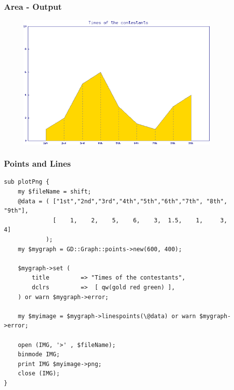 \documentclass{beamer}
\begin{document}
\begin{frame} \frametitle{Area - Output}
\begin{figure}[htbp]
\begin{center}
\includegraphics[width=0.9\textwidth]{image/3.png}
\end{center}
\end{figure}
\end{frame}

\begin{frame}[fragile] \frametitle{Points and Lines}
\begin{lstlisting}[language=perl_u,breaklines=true]
sub plotPng {    
    my $fileName = shift;
    @data = ( ["1st","2nd","3rd","4th","5th","6th","7th", "8th", "9th"],
              [    1,    2,    5,    6,    3,  1.5,    1,     3,     4]
            );
    my $mygraph = GD::Graph::points->new(600, 400);
    
    $mygraph->set (
        title         => "Times of the contestants",
        dclrs         =>  [ qw(gold red green) ],
    ) or warn $mygraph->error;

    my $myimage = $mygraph->linespoints(\@data) or warn $mygraph->error;
    
    open (IMG, '>' , $fileName);
    binmode IMG;
    print IMG $myimage->png;
    close (IMG);
}
\end{lstlisting}
\end{frame}
\end{document}
